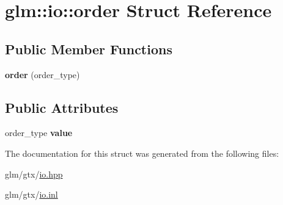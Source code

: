 \hypertarget{structglm_1_1io_1_1order}{\section{glm\-:\-:io\-:\-:order Struct Reference}
\label{structglm_1_1io_1_1order}
}
\subsection*{Public Member Functions}
\begin{DoxyCompactItemize}
\item 
\hypertarget{structglm_1_1io_1_1order_a06813d404c975865fdd3a77146268a1f}{{\bfseries order} (order\-\_\-type)}\label{structglm_1_1io_1_1order_a06813d404c975865fdd3a77146268a1f}

\end{DoxyCompactItemize}
\subsection*{Public Attributes}
\begin{DoxyCompactItemize}
\item 
\hypertarget{structglm_1_1io_1_1order_aa8788dd0568bacd081d02bd5aca9889b}{order\-\_\-type {\bfseries value}}\label{structglm_1_1io_1_1order_aa8788dd0568bacd081d02bd5aca9889b}

\end{DoxyCompactItemize}


The documentation for this struct was generated from the following files\-:\begin{DoxyCompactItemize}
\item 
glm/gtx/\hyperlink{io_8hpp}{io.\-hpp}\item 
glm/gtx/\hyperlink{io_8inl}{io.\-inl}\end{DoxyCompactItemize}
